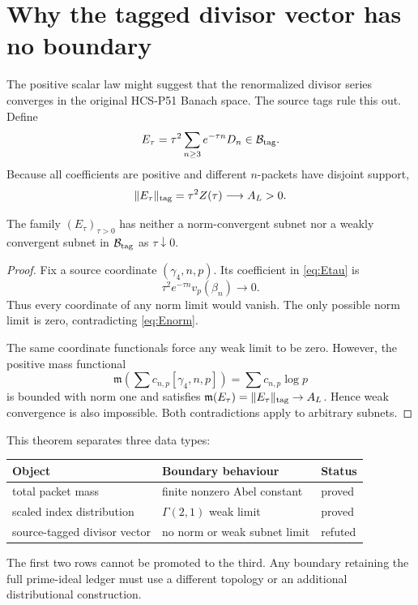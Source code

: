 \section{Why the tagged divisor vector has no boundary}

The positive scalar law might suggest that the renormalized divisor series
converges in the original HCS-P51 Banach space.  The source tags rule this out.
Define
\begin{equation}
E_\tau=\tau^2\sum_{n\ge3}e^{-\tau n}D_n\in\mathcal B_{\mathrm{tag}}.
\label{eq:Etau}
\end{equation}
Because all coefficients are positive and different $n$-packets have
disjoint support,
\begin{equation}
\|E_\tau\|_{\rm tag}=\tau^2Z(\tau)\longrightarrow A_L>0.
\label{eq:Enorm}
\end{equation}

\begin{theorem}
The family $(E_\tau)_{\tau>0}$ has neither a norm-convergent subnet nor a
weakly convergent subnet in $\mathcal B_{\mathrm{tag}}$ as $\tau\downarrow0$.
\end{theorem}

\begin{proof}
Fix a source coordinate $(\gamma_4,n,p)$.  Its coefficient in
\eqref{eq:Etau} is
\[
\tau^2e^{-\tau n}v_p(\beta_n)\longrightarrow0.
\]
Thus every coordinate of any norm limit would vanish.  The only possible
norm limit is zero, contradicting \eqref{eq:Enorm}.

The same coordinate functionals force any weak limit to be zero.  However,
the positive mass functional
\[
\mathfrak m\!\left(\sum c_{n,p}[\gamma_4,n,p]\right)
=\sum c_{n,p}\log p
\]
is bounded with norm one and satisfies
$\mathfrak m(E_\tau)=\|E_\tau\|_{\rm tag}\to A_L$.  Hence weak
convergence is also impossible.  Both contradictions apply to arbitrary
subnets.
\end{proof}

This theorem separates three data types:
\begin{center}
\begin{tabular}{lll}
\toprule
Object & Boundary behaviour & Status\\
\midrule
total packet mass & finite nonzero Abel constant & proved\\
scaled index distribution & $\Gamma(2,1)$ weak limit & proved\\
source-tagged divisor vector & no norm or weak subnet limit & refuted\\
\bottomrule
\end{tabular}
\end{center}
The first two rows cannot be promoted to the third.  Any boundary retaining
the full prime-ideal ledger must use a different topology or an additional
distributional construction.
